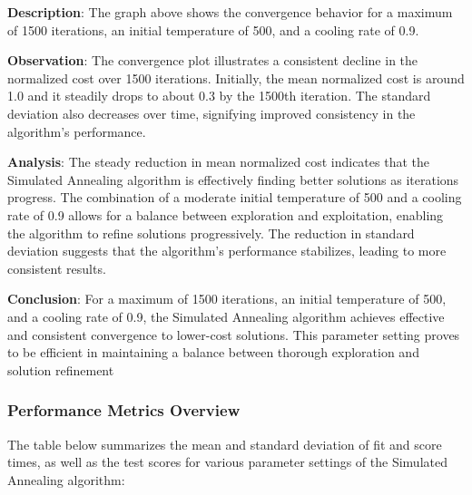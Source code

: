 \documentclass{article}
\begin{document}
    \textbf{Description}: The graph above shows the convergence behavior for a maximum of 1500 iterations, an initial temperature of 500, and a cooling rate of 0.9.

    \textbf{Observation}: The convergence plot illustrates a consistent decline in the normalized cost over 1500 iterations. Initially, the mean normalized cost is around 1.0 and it steadily drops to about 0.3 by the 1500th iteration. The standard deviation also decreases over time, signifying improved consistency in the algorithm’s performance.

    \textbf{Analysis}: The steady reduction in mean normalized cost indicates that the Simulated Annealing algorithm is effectively finding better solutions as iterations progress. The combination of a moderate initial temperature of 500 and a cooling rate of 0.9 allows for a balance between exploration and exploitation, enabling the algorithm to refine solutions progressively. The reduction in standard deviation suggests that the algorithm's performance stabilizes, leading to more consistent results.

    \textbf{Conclusion}: For a maximum of 1500 iterations, an initial temperature of 500, and a cooling rate of 0.9, the Simulated Annealing algorithm achieves effective and consistent convergence to lower-cost solutions. This parameter setting proves to be efficient in maintaining a balance between thorough exploration and solution refinement

    \subsubsection{Performance Metrics Overview}

    The table below summarizes the mean and standard deviation of fit and score times, as well as the test scores for various parameter settings of the Simulated Annealing algorithm:
\end{document}
